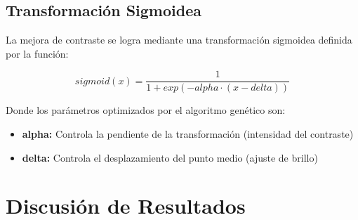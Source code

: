\subsection{Transformación Sigmoidea}
La mejora de contraste se logra mediante una transformación sigmoidea definida por la función:

\begin{equation}
sigmoid(x) = \frac{1}{1 + exp(-alpha \cdot (x - delta))}
\end{equation}

Donde los parámetros optimizados por el algoritmo genético son:
\begin{itemize}
    \item \textbf{alpha:} Controla la pendiente de la transformación (intensidad del contraste)
    \item \textbf{delta:} Controla el desplazamiento del punto medio (ajuste de brillo)
\end{itemize}

\section{Discusión de Resultados}

